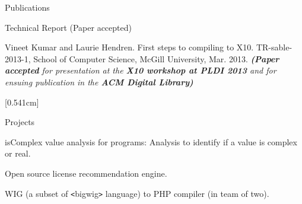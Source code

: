 \documentclass{resume} %
\begin{document}
\begin{rSection}{Publications}
\begin{rSubsection}{Technical Report (Paper accepted)}{}{}{}
\item Vineet Kumar and Laurie Hendren. First steps to compiling \matlab to \textsc{X10}.
TR-sable-2013-1, School of Computer Science, McGill University, Mar. 2013.
\em{\textbf{(Paper accepted} for presentation at the \textbf{X10 workshop at PLDI 2013} and for ensuing publication in the \textbf{ACM Digital Library)}}
\end{rSubsection}
\end{rSection}
\newpage
[0.541cm]
\begin{rSection}{Projects}
\smallskip
\begin{lSubsection}
    \item isComplex value analysis for \matlab programs: Analysis to identify if a value is complex or real. 
    \item Open source license recommendation engine.
    \item WIG (a subset of \verb+<+bigwig\verb+>+ language) to PHP compiler (in team of two).
\end{lSubsection}
\end{rSection}

\end{document}
